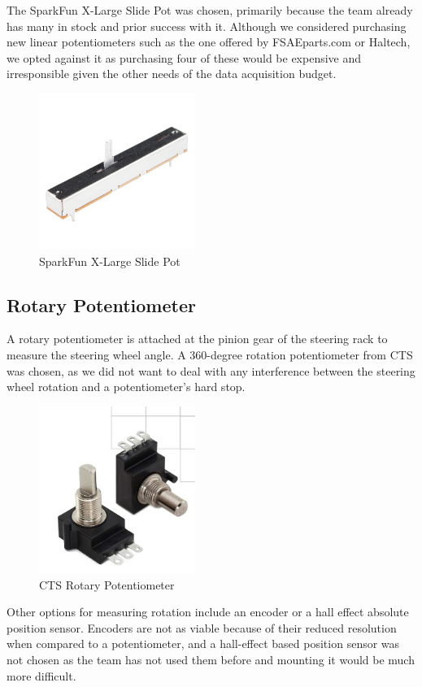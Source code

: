 The SparkFun X-Large Slide Pot was chosen, primarily because the team already has many in stock and prior success with it.
Although we considered purchasing new linear potentiometers such as the one offered by FSAEparts.com or Haltech, we opted against it as purchasing four of these would be expensive and irresponsible given the other needs of the data acquisition budget.
\begin{figure}[H]
        \centering
        \includegraphics[width=2in]{images/slidepot.jpg}
        \caption{SparkFun X-Large Slide Pot}
        \label{fig:slidepot}
\end{figure}

\subsection{Rotary Potentiometer}
A rotary potentiometer is attached at the pinion gear of the steering rack to measure the steering wheel angle.
A 360-degree rotation potentiometer from CTS was chosen, as we did not want to deal with any interference between the steering wheel rotation and a potentiometer's hard stop.
\begin{figure}[H]
        \centering
        \includegraphics[width=2in]{images/pot.jpg}
        \caption{CTS Rotary Potentiometer}
        \label{fig:pot}
\end{figure}
Other options for measuring rotation include an encoder or a hall effect absolute position sensor.
Encoders are not as viable because of their reduced resolution when compared to a potentiometer, and a hall-effect based position sensor was not chosen as the team has not used them before and mounting it would be much more difficult.
